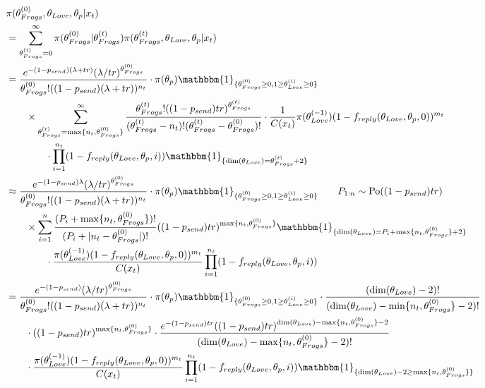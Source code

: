 \documentclass[10pt, a4paper]{article}
\begin{document}
\begin{align*}
        &\pi(\theta_{Frogs}^{(0)},\theta_{Love}, \theta_p|x_t) \\
        &= \sum_{\theta_{Frogs}^{(t)}=0}^{\infty} \pi(\theta_{Frogs}^{(0)}|\theta_{Frogs}^{(t)})\pi(\theta_{Frogs}^{(t)}, \theta_{Love}, \theta_p|x_t) \\
        &= \frac{e^{-(1-p_{send})(\lambda+tr)}(\lambda/tr)^{\theta_{Frogs}^{(0)}}}{\theta_{Frogs}^{(0)}!((1-p_{send})(\lambda+tr))^{n_t}} \cdot\pi(\theta_p) \mathbbm{1}_{\{\theta_{Frogs}^{(0)}\geq 0, 1\geq\theta_{Love}^{(i)}\geq 0\}} \\&\qquad \times \sum_{\theta_{Frogs}^{(t)}=\max\{n_t, \theta_{Frogs}^{(0)}\}}^{\infty} \frac{\theta_{Frogs}^{(t)}!((1-p_{send})tr)^{\theta_{Frogs}^{(t)}}}{(\theta_{Frogs}^{(t)}-n_t)!(\theta_{Frogs}^{(t)}-\theta_{Frogs}^{(0)})!}\cdot \frac{1}{C(x_t)}\pi(\theta_{Love}^{(-1)})(1-f_{reply}(\theta_{Love}, \theta_{p}, 0))^{m_t}\\&\qquad\qquad\cdot\prod_{i=1}^{n_t} (1-f_{reply}(\theta_{Love}, \theta_{p}, i)) \mathbbm{1}_{\{\dim(\theta_{Love}) = \theta_{Frogs}^{(t)}+2\}} \\
        &\approx \frac{e^{-(1-p_{send})\lambda}(\lambda/tr)^{\theta_{Frogs}^{(0)}}}{\theta_{Frogs}^{(0)}!((1-p_{send})(\lambda+tr))^{n_t}} \cdot\pi(\theta_p)\mathbbm{1}_{\{\theta_{Frogs}^{(0)}\geq 0, 1\geq\theta_{Love}^{(i)}\geq 0\}} \qquad P_{1:n} \sim \mathrm{Po}((1-p_{send})tr) \\&\qquad \times \sum_{i=1}^n \frac{(P_i+\max\{n_t, \theta_{Frogs}^{(0)}\})!}{(P_i+|n_t-\theta_{Frogs}^{(0)}|)!}((1-p_{send})tr)^{\max\{n_t, \theta_{Frogs}^{(0)}\}}\mathbbm{1}_{\{\dim(\theta_{Love}) = P_i+\max\{n_t, \theta_{Frogs}^{(0)}\}+2\}} \\&\qquad\qquad\cdot\frac{\pi(\theta_{Love}^{(-1)}) (1-f_{reply}(\theta_{Love}, \theta_{p}, 0))^{m_t}}{C(x_t)}\prod_{i=1}^{n_t} (1-f_{reply}(\theta_{Love}, \theta_{p}, i)) \\
        &= \frac{e^{-(1-p_{send})}(\lambda/tr)^{\theta_{Frogs}^{(0)}}}{\theta_{Frogs}^{(0)}!((1-p_{send})(\lambda+tr))^{n_t}} \cdot\pi(\theta_p)\mathbbm{1}_{\{\theta_{Frogs}^{(0)}\geq 0, 1\geq\theta_{Love}^{(i)}\geq 0\}} \cdot \frac{(\dim(\theta_{Love})-2)!}{(\dim(\theta_{Love})-\min\{n_t,\theta_{Frogs}^{(0)}\}-2)!} \\&\qquad \cdot((1-p_{send})tr)^{\max\{n_t, \theta_{Frogs}^{(0)}\}}\cdot \frac{e^{-(1-p_{send})tr}((1-p_{send})tr)^{\dim(\theta_{Love})-\max\{n_t, \theta_{Frogs}^{(0)}\}-2}}{(\dim(\theta_{Love})-\max\{n_t, \theta_{Frogs}^{(0)}\}-2)!} \\&\qquad\cdot\frac{\pi(\theta_{Love}^{(-1)}) (1-f_{reply}(\theta_{Love}, \theta_{p}, 0))^{m_t}}{C(x_t)}\prod_{i=1}^{n_t} (1-f_{reply}(\theta_{Love}, \theta_{p}, i)) \mathbbm{1}_{\{\dim(\theta_{Love}) -2 \geq \max\{n_t, \theta_{Frogs}^{(0)}\}\}} \\
    \end{align*}
\end{document}
